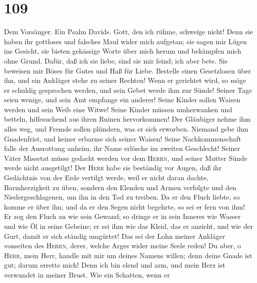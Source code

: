 \hypertarget{section-108}{%
\section{109}\label{section-108}}

 Dem Vorsänger. Ein Psalm Davids. Gott, den ich rühme,
schweige nicht!  Denn sie haben ihr gottloses und falsches
Maul wider mich aufgetan; sie sagen mir Lügen ins Gesicht,
 sie bieten gehässige Worte über mich herum und bekämpfen
mich ohne Grund.  Dafür, daß ich sie liebe, sind sie mir
feind; ich aber bete.  Sie beweisen mir Böses für Gutes
und Haß für Liebe.  Bestelle einen Gesetzlosen über ihn,
und ein Ankläger stehe zu seiner Rechten!  Wenn er
gerichtet wird, so möge er schuldig gesprochen werden, und sein Gebet
werde ihm zur Sünde!  Seiner Tage seien wenige, und sein
Amt empfange ein anderer!  Seine Kinder sollen Waisen
werden und sein Weib eine Witwe!  Seine Kinder müssen
umherwanken und betteln, hilfesuchend aus ihren Ruinen hervorkommen!
 Der Gläubiger nehme ihm alles weg, und Fremde sollen
plündern, was er sich erworben.  Niemand gebe ihm
Gnadenfrist, und keiner erbarme sich seiner Waisen! 
Seine Nachkommenschaft falle der Ausrottung anheim, ihr Name erlösche im
zweiten Geschlecht!  Seiner Väter Missetat müsse gedacht
werden vor dem \textsc{Herrn}, und seiner Mutter Sünde werde nicht
ausgetilgt!  Der \textsc{Herr} habe sie beständig vor
Augen, daß ihr Gedächtnis von der Erde vertilgt werde, 
weil er nicht daran dachte, Barmherzigkeit zu üben, sondern den Elenden
und Armen verfolgte und den Niedergeschlagenen, um ihn in den Tod zu
treiben.  Da er den Fluch liebte, so komme er über ihn;
und da er den Segen nicht begehrte, so sei er fern von ihm!
 Er zog den Fluch an wie sein Gewand; so dringe er in
sein Inneres wie Wasser und wie Öl in seine Gebeine;  er
sei ihm wie das Kleid, das er anzieht, und wie der Gurt, damit er sich
ständig umgürtet!  Das sei der Lohn meiner Ankläger
vonseiten des \textsc{Herrn}, derer, welche Arges wider meine Seele
reden!  Du aber, o \textsc{Herr}, mein Herr, handle mit
mir um deines Namens willen; denn deine Gnade ist gut; darum errette
mich!  Denn ich bin elend und arm, und mein Herz ist
verwundet in meiner Brust.  Wie ein Schatten, wenn er
